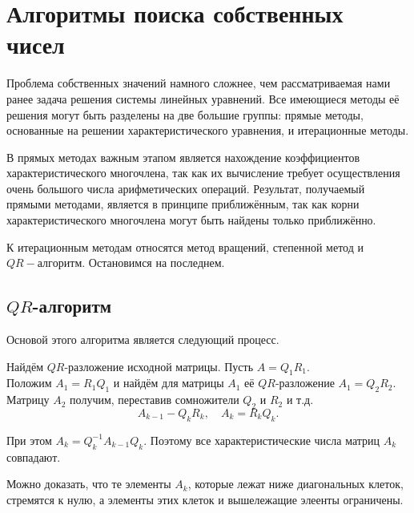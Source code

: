 \documentclass[11pt,a4paper]{article}
\begin{document}
    \hypertarget{ux430ux43bux433ux43eux440ux438ux442ux43cux44b-ux43fux43eux438ux441ux43aux430-ux441ux43eux431ux441ux442ux432ux435ux43dux43dux44bux445-ux447ux438ux441ux435ux43b}{%
\section{Алгоритмы поиска собственных
чисел}\label{ux430ux43bux433ux43eux440ux438ux442ux43cux44b-ux43fux43eux438ux441ux43aux430-ux441ux43eux431ux441ux442ux432ux435ux43dux43dux44bux445-ux447ux438ux441ux435ux43b}}

Проблема собственных значений намного сложнее, чем рассматриваемая нами
ранее задача решения системы линейных уравнений. Все имеющиеся методы её
решения могут быть разделены на две большие группы: прямые методы,
основанные на решении характеристического уравнения, и итерационные
методы.

В прямых методах важным этапом является нахождение коэффициентов
характеристического многочлена, так как их вычисление требует
осуществления очень большого числа арифметических операций. Результат,
получаемый прямыми методами, является в принципе приближённым, так как
корни характеристического многочлена могут быть найдены только
приближённо.

К итерационным методам относятся метод вращений, степенной метод и
\(QR-алгоритм\). Остановимся на последнем.

    \hypertarget{qr-ux430ux43bux433ux43eux440ux438ux442ux43c}{%
\subsection{\texorpdfstring{\(QR\)-алгоритм}{QR-алгоритм}}\label{qr-ux430ux43bux433ux43eux440ux438ux442ux43c}}

Основой этого алгоритма является следующий процесс.

Найдём \(QR\)-разложение исходной матрицы. Пусть \(A = Q_1 R_1\).\\
Положим \(A_1 = R_1 Q_1\) и найдём для матрицы \(A_1\) её
\(QR\)-разложение \(A_1 = Q_2 R_2\). Матрицу \(A_2\) получим, переставив
сомножители \(Q_2\) и \(R_2\) и т.д.
\[ A_{k-1} - Q_k R_k, \quad A_k = R_k Q_k. \]

При этом \(A_k = Q_k^{-1} A_{k-1} Q_k\). Поэтому все
характеристические числа матриц \(A_k\) совпадают.

Можно доказать, что те элементы \(A_k\), которые лежат ниже диагональных
клеток, стремятся к нулю, а элементы этих клеток и вышележащие элеенты
ограничены.
\end{document}
